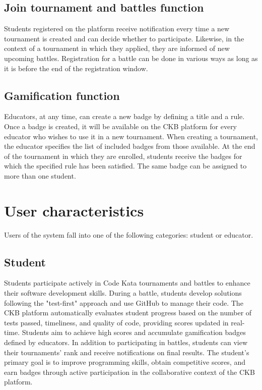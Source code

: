 \subsection{Join tournament and battles function}
Students registered on the platform receive notification every time a new tournament is created and can decide whether to participate.
Likewise, in the context of a tournament in which they applied, they are informed of new upcoming battles.
Registration for a battle can be done in various ways as long as it is before the end of the registration window.

\subsection{Gamification function}
Educators, at any time, can create a new badge by defining a title and a rule. 
Once a badge is created, it will be available on the CKB platform for every educator who wishes to use it in a new tournament. 
When creating a tournament, the educator specifies the list of included badges from those available. 
At the end of the tournament in which they are enrolled, students receive the badges for which the specified rule has been satisfied.
The same badge can be assigned to more than one student.

\section{User characteristics}
Users of the system fall into one of the following categories: student or educator.

\subsection*{Student}
Students participate actively in Code Kata tournaments and battles to enhance their software development skills. 
During a battle, students develop solutions following the "test-first" approach and use GitHub to manage their code. 
The CKB platform automatically evaluates student progress based on the number of tests passed, timeliness, and quality of code, providing scores updated in real-time. 
Students aim to achieve high scores and accumulate gamification badges defined by educators. 
In addition to participating in battles, students can view their tournaments' rank and receive notifications on final results. 
The student's primary goal is to improve programming skills, obtain competitive scores, and earn badges through active participation in the collaborative context of the CKB platform.

